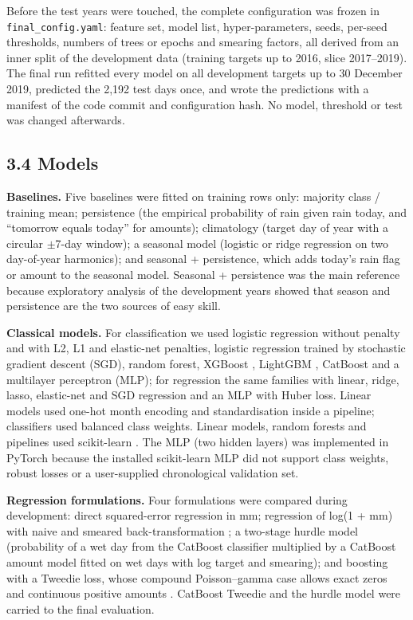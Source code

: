 \documentclass[
]{article}
\begin{document}
Before the test years were touched, the complete configuration was frozen in \texttt{final\_config.yaml}: feature set, model list, hyper-parameters, seeds, per-seed thresholds, numbers of trees or epochs and smearing factors, all derived from an inner split of the development data (training targets up to 2016, slice 2017--2019). The final run refitted every model on all development targets up to 30 December 2019, predicted the 2,192 test days once, and wrote the predictions with a manifest of the code commit and configuration hash.  %
No model, threshold or test was changed afterwards.

\hypertarget{models}{%
\subsection{3.4 Models}\label{models}}

\textbf{Baselines.} Five baselines were fitted on training rows only: majority class / training mean; persistence (the empirical probability of rain given rain today, and ``tomorrow equals today'' for amounts); climatology (target day of year with a circular $\pm$7-day window); a seasonal model (logistic or ridge regression on two day-of-year harmonics); and seasonal + persistence, which adds today's rain flag or amount to the seasonal model. Seasonal + persistence was the main reference because exploratory analysis of the development years showed that season and persistence are the two sources of easy skill.

\textbf{Classical models.} For classification we used logistic regression without penalty and with L2, L1 and elastic-net penalties, logistic regression trained by stochastic gradient descent (SGD), random forest, XGBoost \citep{chen2016xgboost}, LightGBM \citep{ke2017lightgbm}, CatBoost \citep{prokhorenkova2018} and a multilayer perceptron (MLP); for regression the same families with linear, ridge, lasso, elastic-net and SGD regression and an MLP with Huber loss. Linear models used one-hot month encoding and standardisation inside a pipeline; classifiers used balanced class weights. Linear models, random forests and pipelines used scikit-learn \citep{pedregosa2011}. The MLP (two hidden layers) was implemented in PyTorch \citep{paszke2019} because the installed scikit-learn MLP did not support class weights, robust losses or a user-supplied chronological validation set.

\textbf{Regression formulations.} Four formulations were compared during development: direct squared-error regression in mm; regression of log(1 + mm) with naive and smeared back-transformation \citep{duan1983}; a two-stage hurdle model (probability of a wet day from the CatBoost classifier multiplied by a CatBoost amount model fitted on wet days with log target and smearing); and boosting with a Tweedie loss, whose compound Poisson--gamma case allows exact zeros and continuous positive amounts \citep{jorgensen1987}. CatBoost Tweedie and the hurdle model were carried to the final evaluation.
\end{document}
